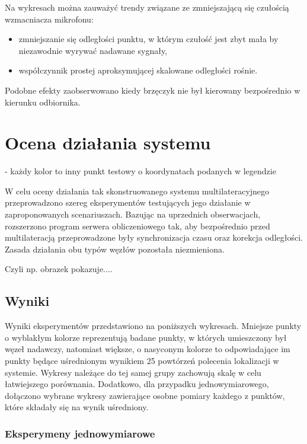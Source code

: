 Na wykresach można zauważyć trendy związane ze zmniejszającą się czułością wzmacniacza mikrofonu:

\begin{itemize}
    \item zmniejszanie się odległości punktu, w którym czułość jest zbyt mała by niezawodnie wyrywać nadawane sygnały,
    \item współczynnik prostej aproksymującej skalowane odległości rośnie.
\end{itemize}

Podobne efekty zaobserwowano kiedy brzęczyk nie był kierowany bezpośrednio w kierunku odbiornika.

\section{Ocena działania systemu}
\color{blue}
- każdy kolor to inny punkt testowy o koordynatach podanych w legendzie 

W celu oceny działania tak skonstruowanego systemu multilateracyjnego przeprowadzono szereg eksperymentów testujących jego działanie   w zaproponowanych scenariuszach. Bazując na uprzednich obserwacjach, rozszerzono program serwera obliczeniowego tak, aby bezpośrednio przed multilateracją przeprowadzone były synchronizacja czasu oraz korekcja odległości. Zasada działania obu typów węzłów pozostała niezmieniona.

Czyli np. obrazek pokazuje....

\color{black}


\subsection{Wyniki}

Wyniki eksperymentów przedstawiono na  poniższych wykresach. Mniejsze punkty o wyblakłym kolorze reprezentują badane punkty, w których umieszczony był węzeł nadawczy, natomiast większe, o nasyconym kolorze to odpowiadające im punkty będące uśrednionym wynikiem 25 powtórzeń polecenia lokalizacji w systemie. Wykresy należące do tej samej grupy zachowują skalę w celu łatwiejszego porównania. Dodatkowo, dla przypadku jednowymiarowego, dołączono wybrane wykresy zawierające osobne pomiary każdego z punktów, które składały się na wynik uśredniony.

\subsubsection{Eksperymeny jednowymiarowe}\label{sec:1d}

